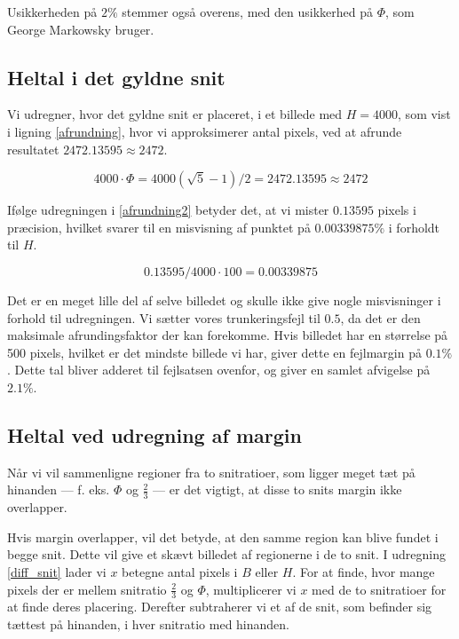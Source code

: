 {Usikkerheden på $2\%$ stemmer også overens, med den usikkerhed
på $\varPhi$, som George Markowsky bruger\cite{Markowsky1992}.

\subsection{Heltal i det gyldne snit}
Vi udregner, hvor det gyldne snit er placeret, i et billede med $H =
4000$, som vist i ligning \eqref{afrundning}, hvor vi approksimerer
antal pixels, ved at afrunde resultatet $2472.13595 \approx 2472$.

\begin{equation}
    4000 \cdot \varPhi = 4000(\sqrt{5}-1)/2 = 2472.13595 \approx 2472
    \label{afrundning}
\end{equation}

Ifølge udregningen i \eqref{afrundning2} betyder det, at vi mister
$0.13595$ pixels i præcision, hvilket svarer til en misvisning af
punktet på $0.00339875\%$ i forholdt til $H$.

\begin{equation}
    0.13595/4000 \cdot 100 = 0.00339875
    \label{afrundning2}
\end{equation}

Det er en meget lille del af selve billedet og skulle ikke give nogle
misvisninger i forhold til udregningen. Vi sætter vores trunkeringsfejl
til $0.5$, da det er den maksimale afrundingsfaktor der kan forekomme.
Hvis billedet har en størrelse på 500 pixels, hvilket er det mindste
billede vi har, giver dette en fejlmargin på $0.1 \%$. Dette tal bliver
adderet til fejlsatsen ovenfor, og giver en samlet afvigelse på $2.1\%$.

\subsection{Heltal ved udregning af margin}\label{margin_udregning}
Når vi vil sammenligne regioner fra to snitratioer,  som
ligger meget tæt på hinanden --- f. eks.  $\varPhi$ og $\frac{2}{3}$ ---
er det vigtigt, at disse to snits margin ikke overlapper.

Hvis margin overlapper, vil det betyde, at den samme region kan blive
fundet i begge snit. Dette vil give et skævt billedet af regionerne i de
to snit.  I udregning \ref{diff_snit} lader vi $x$ betegne
antal pixels i $B$ eller $H$. For at finde, hvor mange pixels der er
mellem snitratio $\frac{2}{3}$ og $\varPhi$, multiplicerer vi $x$ med de
to snitratioer for at finde deres placering. Derefter subtraherer vi et
af de snit, som befinder sig tættest på hinanden, i hver snitratio med
hinanden.

}
